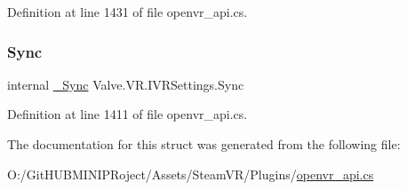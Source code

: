Definition at line 1431 of file openvr\+\_\+api.\+cs.

\mbox{\label{struct_valve_1_1_v_r_1_1_i_v_r_settings_a6b8ec1017ca0a96b16b158be7d6760c9}} 
\subsubsection{\texorpdfstring{Sync}{Sync}}
{\footnotesize\ttfamily internal \mbox{\hyperlink{struct_valve_1_1_v_r_1_1_i_v_r_settings_a0d624461a28bfbc706c1d101a3b3eaf2}{\+\_\+\+Sync}} Valve.\+V\+R.\+I\+V\+R\+Settings.\+Sync}



Definition at line 1411 of file openvr\+\_\+api.\+cs.



The documentation for this struct was generated from the following file\+:\begin{DoxyCompactItemize}
\item 
O\+:/\+Git\+H\+U\+B\+M\+I\+N\+I\+P\+Roject/\+Assets/\+Steam\+V\+R/\+Plugins/\mbox{\hyperlink{openvr__api_8cs}{openvr\+\_\+api.\+cs}}\end{DoxyCompactItemize}
